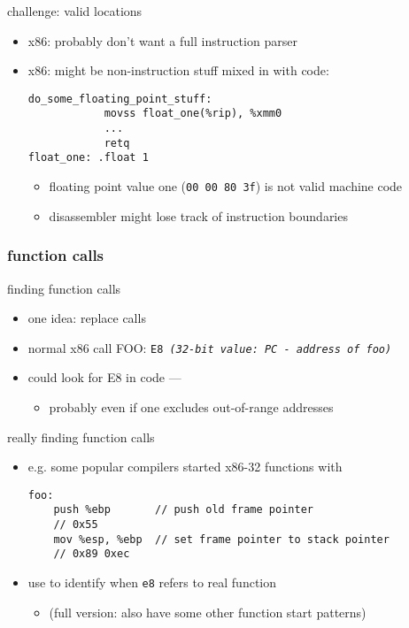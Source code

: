 \begin{frame}[fragile,label=findValidChallenge]{challenge: valid locations}
    \begin{itemize}
    \item x86: probably don't want a full instruction parser
    \item x86: might be non-instruction stuff mixed in with code:
\begin{lstlisting}[language=myasm,style=smaller]
do_some_floating_point_stuff:
            movss float_one(%rip), %xmm0
            ...
            retq
float_one: .float 1
\end{lstlisting}
    \begin{itemize}
        \item floating point value one ({\tt 00 00 80 3f}) is not valid machine code
        \item disassembler might lose track of instruction boundaries
    \end{itemize}
    \end{itemize}
\end{frame}

\subsubsection{function calls}

\begin{frame}[fragile,label=findValidFindFunc]{finding function calls}
    \begin{itemize}
    \item one idea: replace calls
    \item normal x86 call FOO: {\tt E8 \textit{(32-bit value: PC - address of foo)}}
    \item could look for E8 in code --- 
        \begin{itemize}
        \item probably even if one excludes out-of-range addresses
        \end{itemize}
    \end{itemize}
\end{frame}

\begin{frame}[fragile,label=findValidFindFunc2]{really finding function calls}
\lstset{language=myasm,style=small}
    \begin{itemize}
    \item e.g. some popular compilers started x86-32 functions with
\begin{lstlisting}
foo:
    push %ebp       // push old frame pointer
    // 0x55
    mov %esp, %ebp  // set frame pointer to stack pointer
    // 0x89 0xec
\end{lstlisting}
    \item use to identify when {\tt e8} refers to real function
    \begin{itemize}
    \item (full version: also have some other function start patterns)
    \end{itemize}
    \end{itemize}
\end{frame}


